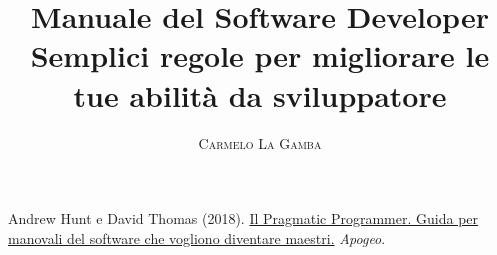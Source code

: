 \documentclass[twoside,onecolumn]{article}
\title{Manuale del Software Developer \\ \large Semplici regole per migliorare le tue abilità da sviluppatore}
\author{
	\textsc{Carmelo La Gamba}\\[1ex]
	\normalsize
	\href{https://carmelolg.github.io/}{\faicon{github}}
	\href{https://t.me/carmelolg}{\faicon{paper-plane}}
}
\date{} %
\begin{document}
\maketitle


\newpage


\newpage


\newpage



\newpage


\begin{thebibliography}{99} %

Andrew Hunt e David Thomas (2018).
\newblock \href{https://www.amazon.it/dp/8850332548/ref=cm_sw_em_r_mt_dp_AvYCFbNVMFA1X}{Il Pragmatic Programmer. Guida per manovali del software che vogliono diventare maestri.}
\newblock \emph{Apogeo}.
 
\end{thebibliography}

\end{document}
